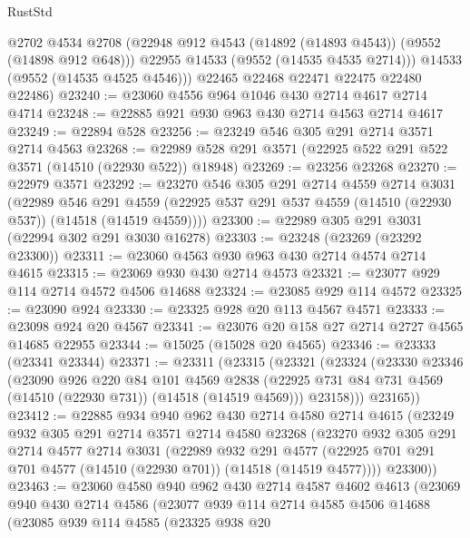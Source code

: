 \begin{lexlean}{RustStd}
\begin{coremodule}
          @2702
          @4534
          @2708
          (@22948 @912 @4543 (@14892 (@14893 @4543)) (@9552 (@14898 @912 @648)))
          @22955
          @14533
          (@9552 (@14535 @4535 @2714)))
        @14533
        (@9552 (@14535 @4525 @4546)))
      @22465
      @22468
      @22471
      @22475
      @22480
      @22486)
@23240 := @23060 @4556 @964 @1046 @430 @2714 @4617 @2714 @4714
@23248 := @22885 @921 @930 @963 @430 @2714 @4563 @2714 @4617
@23249 := @22894 @528
@23256 := @23249 @546 @305 @291 @2714 @3571 @2714 @4563
@23268 := @22989 @528 @291 @3571 (@22925 @522 @291 @522 @3571 (@14510 (@22930 @522)) @18948)
@23269 := @23256 @23268
@23270 := @22979 @3571
@23292 := @23270
    @546
    @305
    @291
    @2714
    @4559
    @2714
    @3031
    (@22989
      @546
      @291
      @4559
      (@22925 @537 @291 @537 @4559 (@14510 (@22930 @537)) (@14518 (@14519 @4559))))
@23300 := @22989 @305 @291 @3031 (@22994 @302 @291 @3030 @16278)
@23303 := @23248 (@23269 (@23292 @23300))
@23311 := @23060 @4563 @930 @963 @430 @2714 @4574 @2714 @4615
@23315 := @23069 @930 @430 @2714 @4573
@23321 := @23077 @929 @114 @2714 @4572 @4506 @14688
@23324 := @23085 @929 @114 @4572
@23325 := @23090 @924
@23330 := @23325 @928 @20 @113 @4567 @4571
@23333 := @23098 @924 @20 @4567
@23341 := @23076 @20 @158 @27 @2714 @2727 @4565 @14685 @22955
@23344 := @15025 (@15028 @20 @4565)
@23346 := @23333 (@23341 @23344)
@23371 := @23311
    (@23315
      (@23321
        (@23324
          (@23330
            @23346
            (@23090
              @926
              @220
              @84
              @101
              @4569
              @2838
              (@22925 @731 @84 @731 @4569 (@14510 (@22930 @731)) (@14518 (@14519 @4569)))
              @23158)))
        @23165))
@23412 := @22885
    @934
    @940
    @962
    @430
    @2714
    @4580
    @2714
    @4615
    (@23249
      @932
      @305
      @291
      @2714
      @3571
      @2714
      @4580
      @23268
      (@23270
        @932
        @305
        @291
        @2714
        @4577
        @2714
        @3031
        (@22989
          @932
          @291
          @4577
          (@22925 @701 @291 @701 @4577 (@14510 (@22930 @701)) (@14518 (@14519 @4577))))
        @23300))
@23463 := @23060
    @4580
    @940
    @962
    @430
    @2714
    @4587
    @4602
    @4613
    (@23069
      @940
      @430
      @2714
      @4586
      (@23077
        @939
        @114
        @2714
        @4585
        @4506
        @14688
        (@23085
          @939
          @114
          @4585
          (@23325
            @938
            @20

\end{coremodule}
\end{lexlean}
